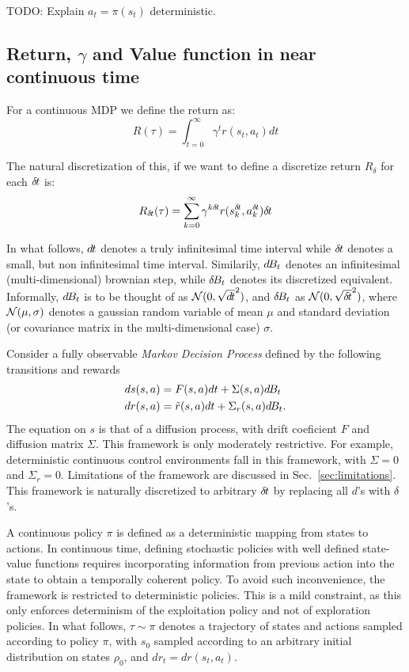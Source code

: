 TODO: Explain $a_t = \pi(s_t)$ deterministic.

\subsection{Return, $\gamma$ and Value function in near continuous time}
\label{sec:ret-gamma-v}

For a continuous MDP we define the return as:
\begin{equation}
  \label{eq:continuous-return}
  R(\tau) = \int_{t=0}^\infty\gamma^tr(s_t, a_t)dt
\end{equation}

The natural discretization of this, if we want to define a discretize return $R_\delta$ for each ${\delta\hspace{-.1em}t}$ is:
\begin{equation}
  \label{eq:discretized-return}
  R_{\delta\hspace{-.1em}t}(\tau) = \sum_{k=0}^\infty\gamma^{k{\delta\hspace{-.1em}t}}r(s^{\delta\hspace{-.1em}t}_k, a^{\delta\hspace{-.1em}t}_k){\delta\hspace{-.1em}t}
\end{equation}

In what follows, $d\hspace{-.1em}t$ denotes a truly infinitesimal time interval while ${\delta\hspace{-.1em}t}$
denotes a small, but non infinitesimal time interval. Similarily, $d\hspace{-.1em}B_t$ denotes
an infinitesimal (multi-dimensional) brownian step, while $\delta\hspace{-.1em}B_t$ denotes its
discretized equivalent. Informally, $d\hspace{-.1em}B_t$ is to be thought of as $\mathcal{N}(0, \sqrt{d\hspace{-.1em}t}^2)$,
and $\delta\hspace{-.1em}B_t$ as $\mathcal{N}(0, \sqrt{{\delta\hspace{-.1em}t}}^2)$, where $\mathcal{N}(\mu, \sigma)$ denotes a gaussian
random variable of mean $\mu$ and standard deviation (or covariance matrix in the multi-dimensional case)
$\sigma$.

Consider a fully observable \emph{Markov Decision Process} defined by the following
transitions and rewards
\begin{align}
	ds(s, a) &= F(s, a) dt + \Sigma(s, a) d\hspace{-.1em}B_t\\
	dr(s, a) &= \tilde{r}(s, a) dt + \Sigma_r(s, a) d\hspace{-.1em}B_t.
\end{align}
The equation on $s$ is that of a diffusion process, with drift coeficient $F$
and diffusion matrix $\Sigma$.  This framework is only moderately restrictive.
For example, deterministic continuous control environments fall in this
framework, with $\Sigma = 0$ and $\Sigma_r = 0$. Limitations of the framework
are discussed in Sec.~\ref{sec:limitations}.
This framework is naturally discretized to arbitrary ${\delta\hspace{-.1em}t}$ by replacing all
$d$'s with $\delta$'s.

A continuous policy $\pi$ is defined as a deterministic mapping from states to
actions.  In continuous time, defining stochastic policies with well defined
state-value functions requires incorporating information from previous action into
the state to obtain a temporally coherent policy. To avoid such inconvenience, the
framework is restricted to deterministic policies. This is a mild constraint, as this
only enforces determinism of the exploitation policy and not of exploration policies.
In what follows, $\tau\sim\pi$ denotes a trajectory of states and actions sampled
according to policy $\pi$, with $s_0$ sampled according to an arbitrary initial distribution
on states $\rho_0$, and $dr_{t} = dr(s_t, a_t)$.

